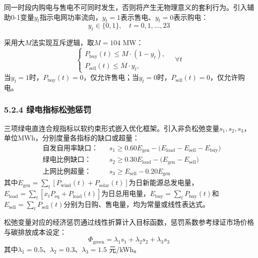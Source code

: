 \documentclass[zihao=-4,a4paper]{ctexart} %
\begin{document}
	同一时段内购电与售电不可同时发生，否则将产生无物理意义的套利行为。引入辅助0-1变量$y_t$指示电网功率流向，$y_t=1$表示售电、$y_t=0$表示购电：
	\begin{equation}
		y_t \in \{0,1\},\quad t=0,1,\dots,23
		\label{eq:q2_grid_dir}
	\end{equation}
	
	采用大$M$法实现互斥逻辑，取$M = 104$ MW：
	\begin{equation}
		\begin{cases}
			P_{\text{buy}}(t) \leq M \cdot (1 - y_t), \\[4pt]
			P_{\text{sell}}(t) \leq M \cdot y_t,
		\end{cases}
		\quad \forall t
		\label{eq:q2_bigm}
	\end{equation}
	当$y_t=1$时，$P_{\text{buy}}(t)=0$，仅允许售电；当$y_t=0$时，$P_{\text{sell}}(t)=0$，仅允许购电。
	
	\subsubsection*{5.2.4 绿电指标松弛惩罚}
	
	三项绿电直连合规指标以软约束形式嵌入优化框架。引入非负松弛变量$s_1,s_2,s_3$，单位MWh，分别度量各指标的缺口或超量：
	\begin{align}
		&\text{自发自用率缺口：} && s_1 \geq 0.60 E_{\text{gen}} - \bigl(E_{\text{load}} - E_{\text{sell}} - E_{\text{buy}}\bigr)
		\label{eq:q2_slack1} \\
		&\text{绿电比例缺口：} && s_2 \geq 0.30 E_{\text{load}} - \bigl(E_{\text{gen}} - E_{\text{sell}}\bigr)
		\label{eq:q2_slack2} \\
		&\text{上网比例超量：} && s_3 \geq E_{\text{sell}} - 0.20 E_{\text{gen}}
		\label{eq:q2_slack3}
	\end{align}
	其中$E_{\text{gen}} = \sum_t [P_{\text{wind}}(t) + P_{\text{solar}}(t)]$为日新能源总发电量，$E_{\text{load}} = \sum_t [x_t P_{\text{eq}} + P_{\text{load}}(t)]$为日总用电量，$E_{\text{buy}} = \sum_t P_{\text{buy}}(t)$和$E_{\text{sell}} = \sum_t P_{\text{sell}}(t)$分别为日购、售电量，均为常量或线性表达式。
	
	松弛变量对应的经济惩罚通过线性折算计入目标函数，惩罚系数参考绿证市场价格与碳排放成本设定：
	\begin{equation}
		\Phi_{\text{green}} = \lambda_1 s_1 + \lambda_2 s_2 + \lambda_3 s_3
		\label{eq:q2_phi}
	\end{equation}
	其中$\lambda_1=0.5$、$\lambda_2=0.3$、$\lambda_3=1.5$ 元/kWh。
	
\end{document}
